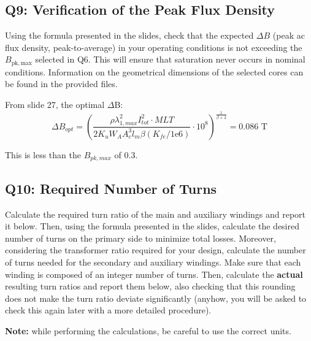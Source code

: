 \documentclass{PELsmallreport}
\begin{document}
  \hfill{}




\subsection{Q9: Verification of the Peak Flux Density} 
Using the formula presented in the slides, check that the expected $\Delta B$ (peak ac flux density, peak-to-average) in your operating conditions is not exceeding the $B_\mathrm{pk,max}$ selected in Q6. 
This will ensure that saturation never occurs in nominal conditions.
Information on the geometrical dimensions of the selected cores can be found in the provided files.
\\

\begin{framed}
	\vspace{2em}
	From slide 27, the optimal \(\Delta\)B:
    $$\Delta B_{opt} = \left( \frac{\rho \lambda_{1,max}^2 I_{tot}^2 \cdot MLT}{2 K_u W_A A_c^3 l_m \beta (K_{fe}/\text{1e6})} \cdot 10^8 \right)^{\frac{1}{\beta + 2}} = 0.086 \text{ T}$$

    This is less than the \(B_{pk,max}\) of 0.3.
	\vspace{2em}
\end{framed}

  \hfill{}





\subsection{Q10: Required Number of Turns } 
Calculate the required turn ratio of the main and auxiliary windings and report it below. 
Then, using the formula presented in the slides, calculate the desired number of turns on the primary side to minimize total losses. 
Moreover, considering the transformer ratio required for your design, calculate the number of turns needed for the secondary and auxiliary windings. 
Make sure that each winding is composed of an integer number of turns.
Then, calculate the \textbf{actual} resulting turn ratios and report them below, also checking that this rounding does not make the turn ratio deviate significantly (anyhow, you will be asked to check this again later with a more detailed procedure). 


\textbf{Note:} while performing the calculations, be careful to use the correct units. 
\\
\end{document}
